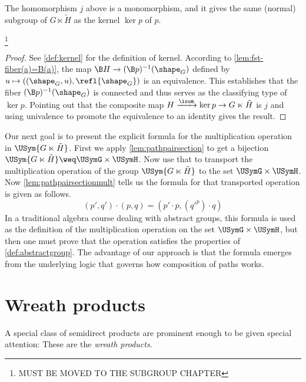 \begin{lemma}
  The homomorphism $j$ above is a monomorphism, and it gives the same (normal) subgroup of $G \ltimes \tilde H$ as the kernel $\ker p$ of $p$.
\end{lemma}
\footnote{{\color{red}MUST BE MOVED TO THE SUBGROUP CHAPTER}}

\begin{proof}
  See \ref{def:kernel} for the definition of kernel.  According to \cref{lem:fst-fiber(a)=B(a)}, the map $\B H \to (\B p)^{-1}(\shape_G)$ defined by
  $ u \mapsto ((\shape_G,u), \refl{\shape_G}) $ is an equivalence.  This establishes that the fiber $(\B p)^{-1}(\shape_G)$ is connected and thus serves as
  the classifying type of $\ker p$.  Pointing out that the composite map $H \xrightarrow{\isom} \ker p \to G \ltimes \tilde H$ is $j$ and using
  univalence to promote the equivalence to an identity gives the result.
\end{proof}

Our next goal is to present the explicit formula for the multiplication operation in $\USym { G \ltimes \tilde H }$.
First we apply \cref{lem:pathpairsection} to get a bijection $\USym { G \ltimes \tilde H } \weq \USymG \times \USymH$.
Now use that to transport the multiplication operation of the group $\USym { G \ltimes \tilde H }$ to the set $\USymG \times \USymH$.
Now \cref{lem:pathpairsectionmult} tells us the formula for that transported operation is given as follows.
$$ (p',q') \cdot (p,q) = (p' \cdot p , ({q'} ^ p) \cdot q) $$
In a traditional algebra course dealing with abstract groups, this formula is used as the definition of the multiplication operation
on the set $\USymG \times \USymH$, but then one must prove that the operation satisfies the properties of \cref{def:abstractgroup}.
The advantage of our approach is that the formula emerges from the underlying logic that governs how composition of paths works.


\section{Wreath products}
\label{sec:wreath}

A special class of semidirect products are prominent enough to be given special attention: These are the \emph{wreath products}.

